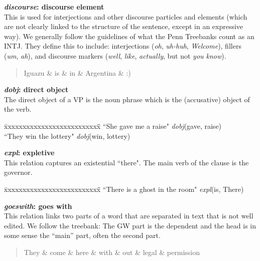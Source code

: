 \documentclass[11pt,letter]{article}
\begin{document}
\noindent\textbf{\emph{discourse}: discourse element}\\
This is used for interjections and other discourse particles and
elements (which are not clearly linked to the structure of the
sentence, except in an expressive way). We generally follow the
guidelines of what the Penn Treebanks count as an INTJ.  They
define this to include: interjections (\emph{oh}, \emph{uh-huh},
\emph{Welcome}), fillers (\emph{um}, \emph{ah}), and discourse
markers (\emph{well}, \emph{like}, \emph{actually}, but not \emph{you know}).
\begin{quote}
\begin{dependency}
   \begin{deptext}[column sep=0.25cm]
      Iguazu \& is \& in \& Argentina \& :) \\
   \end{deptext}
\end{dependency}
\end{quote}

\noindent\textbf{\emph{dobj}: direct object}\\
The direct object of a VP is the noun phrase which is the (accusative) object of the verb.
\begin{tabbing}
\hspace{1cm} \= xxxxxxxxxxxxxxxxxxxxxxxxxx\= \hspace{.5cm}\=  \kill
\>  ``She gave me a raise" \> \> \emph{dobj}(gave, raise)\\
\hspace{1cm} \> ``They win the lottery" \> \>  \emph{dobj}(win, lottery)\\
\end{tabbing}


\noindent\textbf{\emph{expl}: expletive}\\
This relation captures an existential ``there". The main verb of the clause is the governor.
\begin{tabbing}
\hspace{1cm} \= xxxxxxxxxxxxxxxxxxxxxxxxxx\= \hspace{.5cm}\=  \kill
\> ``There is a ghost in the room" \>\> \emph{expl}(is, There)\\
\end{tabbing}

\noindent\textbf{\emph{goeswith}: goes with}\\
This relation links two parts of a word that are separated in text
that is not well edited. We follow the treebank: The GW part is the
dependent and the head is in some sense the ``main'' part, often the
second part.
\begin{quote}
\begin{dependency}
   \begin{deptext}[column sep=0.2em]
      They \& come \& here \& with \& out \& legal \& permission \\
   \end{deptext}
\end{dependency}
\end{quote}
\end{document}
